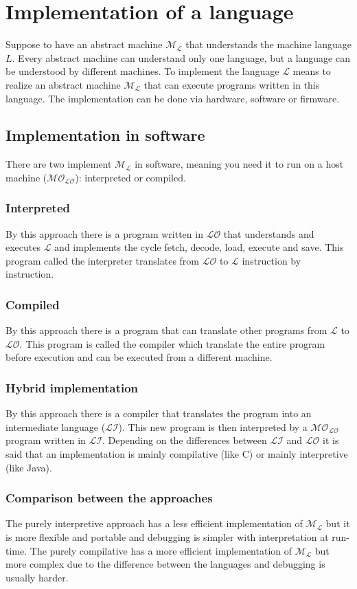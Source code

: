 \chapter{Implementation of a language}
Suppose to have an abstract machine $\mathcal{M_L}$ that understands the machine language $L$. Every abstract machine can understand only one language, but a language can be understood
by different machines. To implement the language $\mathcal{L}$ means to realize an abstract machine $\mathcal{M_L}$ that can execute programs written in this language. The implementation
can be done via hardware, software or firmware.
\section{Implementation in software}
There are two implement $\mathcal{M_L}$ in software, meaning you need it to run on a host machine ($\mathcal{MO_{LO}}$): interpreted or compiled.
\subsection{Interpreted}
By this approach there is a program written in $\mathcal{LO}$ that understands and executes $\mathcal{L}$ and implements the cycle fetch, decode, load, execute and save. This program
called the interpreter translates from $\mathcal{LO}$ to $\mathcal{L}$ instruction by instruction.
\subsection{Compiled}
By this approach there is a program that can translate other programs from $\mathcal{L}$ to $\mathcal{LO}$. This program is called the compiler which translate the entire program before
execution and can be executed from a different machine.
\subsection{Hybrid implementation}
By this approach there is a compiler that translates the program into an intermediate language ($\mathcal{LI}$). This new program is then interpreted by a $\mathcal{MO_{LO}}$ program
written in $\mathcal{LI}$. Depending on the differences between $\mathcal{LI}$ and $\mathcal{LO}$ it is said that an implementation is mainly compilative (like C) or mainly interpretive
(like Java).
\subsection{Comparison between the approaches}
The purely interpretive approach has a less efficient implementation of $\mathcal{M_L}$ but it is more flexible and portable and debugging is simpler with interpretation at run-time.
The purely compilative has a more efficient implementation of $\mathcal{M_L}$ but more complex due to the difference between the languages and debugging is usually harder.

